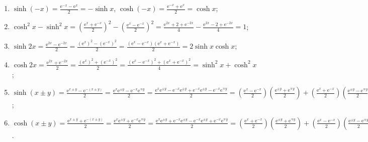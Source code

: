 \begin{solution}
    \begin{enumerate}
        \item $\sinh(-x) = \frac{\mathrm{e}^{-x} - \mathrm{e}^x}{2} = -\sinh x$, $\cosh(-x) = \frac{\mathrm{e}^{-x} + \mathrm{e}^x}{2} = \cosh x$;
        \item $\cosh^2 x - \sinh^2 x = \left( \frac{\mathrm{e}^x + \mathrm{e}^{-x}}{2} \right)^2 - \left( \frac{\mathrm{e}^x - \mathrm{e}^{-x}}{2} \right)^2 = \frac{\mathrm{e}^{2x} + 2 + \mathrm{e}^{-2x}}{4} - \frac{\mathrm{e}^{2x} - 2 + \mathrm{e}^{-2x}}{4} = 1$;
        \item $\sinh 2x = \frac{\mathrm{e}^{2x} - \mathrm{e}^{-2x}}{2} = \frac{(\mathrm{e}^x)^2 - (\mathrm{e}^{-x})^2}{2} = \frac{(\mathrm{e}^x - \mathrm{e}^{-x})(\mathrm{e}^x + \mathrm{e}^{-x})}{2} = 2\sinh x \cosh x$;
        \item $\cosh 2x = \frac{\mathrm{e}^{2x} + \mathrm{e}^{-2x}}{2} = \frac{(\mathrm{e}^x)^2 + (\mathrm{e}^{-x})^2}{2} = \frac{(\mathrm{e}^x - \mathrm{e}^{-x})^2 + (\mathrm{e}^x + \mathrm{e}^{-x})^2}{4} = \sinh^2 x + \cosh^2 x$;
        \item $\sinh(x \pm y) = \frac{\mathrm{e}^{x \pm y} - \mathrm{e}^{-(x \pm y)}}{2} =
                  \frac{\mathrm{e}^x \mathrm{e}^{\pm y} - \mathrm{e}^{-x} \mathrm{e}^{\mp y}}{2} = \frac{\mathrm{e}^x \mathrm{e}^{\pm y} - \mathrm{e}^{-x} \mathrm{e}^{\pm y} + \mathrm{e}^{-x} \mathrm{e}^{\pm y} - \mathrm{e}^{-x} \mathrm{e}^{\mp y}}{2} =
                  \left( \frac{\mathrm{e}^x - \mathrm{e}^{-x}}{2} \right) \left( \frac{\mathrm{e}^{\pm y} + \mathrm{e}^{\mp y}}{2} \right) + \left( \frac{\mathrm{e}^x + \mathrm{e}^{-x}}{2} \right) \left( \frac{\mathrm{e}^{\pm y} - \mathrm{e}^{\mp y}}{2} \right) =
                  \sinh x \cosh y \pm \cosh x \sinh y$;
        \item $\cosh(x \pm y) =
                  \frac{\mathrm{e}^{x \pm y} + \mathrm{e}^{-(x \pm y)}}{2} =\frac{\mathrm{e}^x \mathrm{e}^{\pm y} + \mathrm{e}^{-x} \mathrm{e}^{\mp y}}{2}
                  =\frac{\mathrm{e}^x \mathrm{e}^{\pm y} + \mathrm{e}^{-x} \mathrm{e}^{\pm y} - \mathrm{e}^{-x} \mathrm{e}^{\pm y} + \mathrm{e}^{-x} \mathrm{e}^{\mp y}}{2}
                  = \left( \frac{\mathrm{e}^x + \mathrm{e}^{-x}}{2} \right) \left( \frac{\mathrm{e}^{\pm y} + \mathrm{e}^{\mp y}}{2} \right) + \left( \frac{\mathrm{e}^x - \mathrm{e}^{-x}}{2} \right) \left( \frac{\mathrm{e}^{\pm y} - \mathrm{e}^{\mp y}}{2} \right)
                  = \cosh x \cosh y \pm \sinh x \sinh y$.
    \end{enumerate}
\end{solution}

\newpage